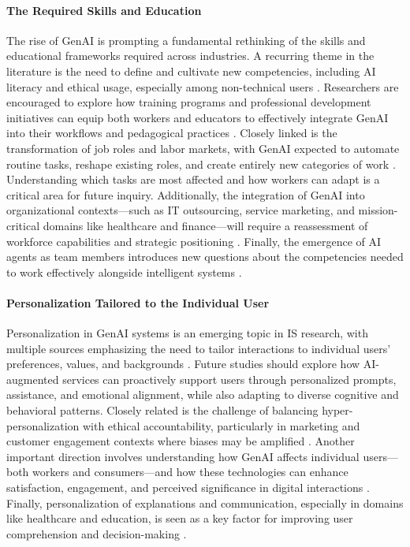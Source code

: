 \paragraph{The Required Skills and Education}
The rise of GenAI is prompting a fundamental rethinking of the skills and educational frameworks required across industries. A recurring theme in the literature is the need to define and cultivate new competencies, including AI literacy and ethical usage, especially among non-technical users \parencite{R07, S06, S12}. Researchers are encouraged to explore how training programs and professional development initiatives can equip both workers and educators to effectively integrate GenAI into their workflows and pedagogical practices \parencite{R08, S12}. Closely linked is the transformation of job roles and labor markets, with GenAI expected to automate routine tasks, reshape existing roles, and create entirely new categories of work \parencite{R04, R05, R07, R08}. Understanding which tasks are most affected and how workers can adapt is a critical area for future inquiry. Additionally, the integration of GenAI into organizational contexts—such as IT outsourcing, service marketing, and mission-critical domains like healthcare and finance—will require a reassessment of workforce capabilities and strategic positioning \parencite{R03, R10}. Finally, the emergence of AI agents as team members introduces new questions about the competencies needed to work effectively alongside intelligent systems \parencite{S06}.

\paragraph{Personalization Tailored to the Individual User}
Personalization in GenAI systems is an emerging topic in IS research, with multiple sources emphasizing the need to tailor interactions to individual users’ preferences, values, and backgrounds \parencite{R05, R08, S18}. Future studies should explore how AI-augmented services can proactively support users through personalized prompts, assistance, and emotional alignment, while also adapting to diverse cognitive and behavioral patterns. Closely related is the challenge of balancing hyper-personalization with ethical accountability, particularly in marketing and customer engagement contexts where biases may be amplified \parencite{R01, R08}. Another important direction involves understanding how GenAI affects individual users—both workers and consumers—and how these technologies can enhance satisfaction, engagement, and perceived significance in digital interactions \parencite{R07, R10}. Finally, personalization of explanations and communication, especially in domains like healthcare and education, is seen as a key factor for improving user comprehension and decision-making \parencite{S11, S18}.

